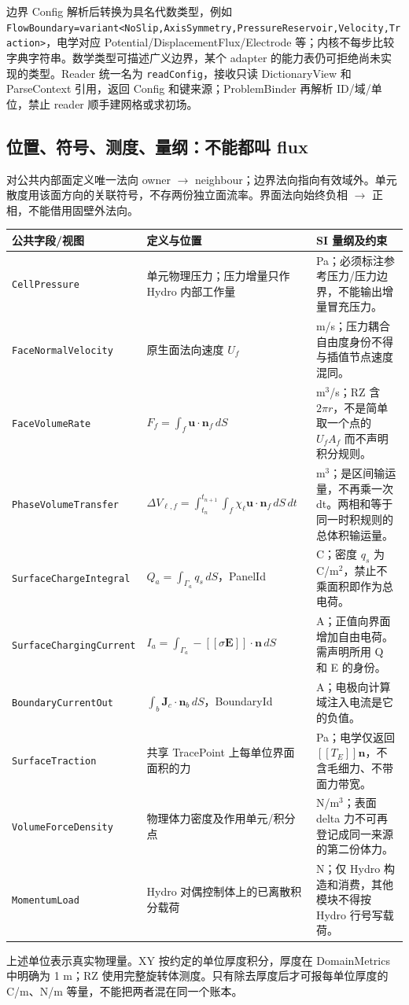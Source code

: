 \documentclass[UTF8,a4paper,11pt,fontset=fandol]{ctexart}
\numberwithin{equation}{section}
\newcommand{\code}[1]{\nolinkurl{#1}}
\begin{document}
边界 Config 解析后转换为具名代数类型，例如 \code{FlowBoundary=variant<NoSlip,AxisSymmetry,PressureReservoir,Velocity,Traction>}，电学对应 Potential/DisplacementFlux/Electrode 等；内核不每步比较字典字符串。数学类型可描述广义边界，某个 adapter 的能力表仍可拒绝尚未实现的类型。Reader 统一名为 \code{readConfig}，接收只读 DictionaryView 和 ParseContext 引用，返回 Config 和键来源；ProblemBinder 再解析 ID/域/单位，禁止 reader 顺手建网格或求初场。

\subsection{位置、符号、测度、量纲：不能都叫 flux}
对公共内部面定义唯一法向 owner $\to$ neighbour；边界法向指向有效域外。单元散度用该面方向的关联符号，不存两份独立面流率。界面法向始终负相 $\to$ 正相，不能借用固壁外法向。
\begin{longtable}{@{}P{.22\textwidth}P{.36\textwidth}P{.36\textwidth}@{}}
\toprule 公共字段/视图 & 定义与位置 & SI 量纲及约束\\\midrule\endhead
\code{CellPressure} & 单元物理压力；压力增量只作 Hydro 内部工作量 & Pa；必须标注参考压力/压力边界，不能输出增量冒充压力。\\
\code{FaceNormalVelocity} & 原生面法向速度 $U_f$ & m/s；压力耦合自由度身份不得与插值节点速度混同。\\
\code{FaceVolumeRate} & $F_f=\int_f\bm u\cdot\bm n_f\,dS$ & m$^3$/s；RZ 含 $2\pi r$，不是简单取一个点的 $U_f A_f$ 而不声明积分规则。\\
\code{PhaseVolumeTransfer} & $\Delta V_{\ell,f}=\int_{t_n}^{t_{n+1}}\int_f \chi_\ell\bm u\cdot\bm n_f\,dS\,dt$ & m$^3$；是区间输运量，不再乘一次 dt。两相和等于同一时积规则的总体积输运量。\\
\code{SurfaceChargeIntegral} & $Q_a=\int_{\Gamma_a}q_s\,dS$，PanelId & C；密度 $q_s$ 为 C/m$^2$，禁止不乘面积即作为总电荷。\\
\code{SurfaceChargingCurrent} & $I_a=\int_{\Gamma_a}-[\![\sigma\bm E]\!]\cdot\bm n\,dS$ & A；正值向界面增加自由电荷。需声明所用 Q 和 E 的身份。\\
\code{BoundaryCurrentOut} & $\int_b\bm J_c\cdot\bm n_b\,dS$，BoundaryId & A；电极向计算域注入电流是它的负值。\\
\code{SurfaceTraction} & 共享 TracePoint 上每单位界面面积的力 & Pa；电学仅返回 $[\![T_E]\!]\bm n$，不含毛细力、不带面力带宽。\\
\code{VolumeForceDensity} & 物理体力密度及作用单元/积分点 & N/m$^3$；表面 delta 力不可再登记成同一来源的第二份体力。\\
\code{MomentumLoad} & Hydro 对偶控制体上的已离散积分载荷 & N；仅 Hydro 构造和消费，其他模块不得按 Hydro 行号写载荷。\\
\bottomrule
\end{longtable}
上述单位表示真实物理量。XY 按约定的单位厚度积分，厚度在 DomainMetrics 中明确为 1 m；RZ 使用完整旋转体测度。只有除去厚度后才可报每单位厚度的 C/m、N/m 等量，不能把两者混在同一个账本。
\end{document}
